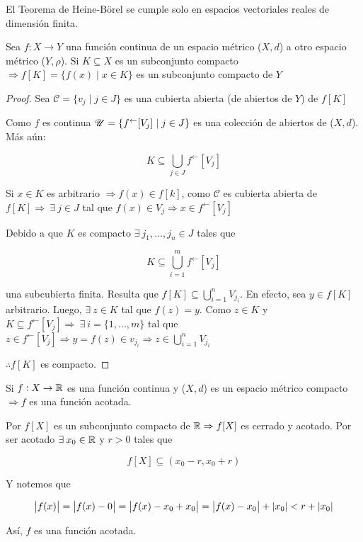 \begin{corollary}
    El Teorema de Heine-Börel se cumple solo en espacios vectoriales reales de dimensión finita.
\end{corollary}


\begin{theorem} \label{theom335}
    Sea $f : X \to Y$ una función continua de un espacio métrico ($X,d$) a otro espacio métrico ($Y,\rho$). Si $K \subseteq X$ es un subconjunto compacto $\Rightarrow f [K] = \{ f(x) \mid x \in K \}$ es un subconjunto compacto de $Y$
\end{theorem}

\begin{proof}
    Sea $\mathscr{C} = \{ v_j \mid j \in J \}$ es una cubierta abierta (de abiertos de $Y$) de $f[K]$

    Como $f$ es continua $\mathscr{U} = \{ f^\leftarrow[V_j] \mid j \in J \}$ es una colección de abiertos de ($X,d$). Más aún:

    $$K \subseteq \bigcup_{j\in  J} f^\leftarrow[V_j] $$

    Si $x \in K$ es arbitrario $\Rightarrow f(x) \in f[k]$, como $\mathscr{C}$ es cubierta abierta de $f[K] \Rightarrow \: \exists \: j \in J$ tal que $f(x) \in V_j \Rightarrow x \in f^\leftarrow[V_j] $

    Debido a que $K$ es compacto $\exists \: j_1, ..., j_n \in J$ tales que

    $$K \subseteq \bigcup_{i=1}^{m} f^\leftarrow[V_j] $$

    una subcubierta finita. Resulta que $f[K] \subseteq \bigcup_{i=1}^{n}V_{j_i}$. En efecto, sea $y \in f[K]$ arbitrario. Luego, $\exists \: z \in K$ tal que $f(z) = y$. Como $z \in K$ y $K \subseteq f^\leftarrow[V_j] \Rightarrow \: \exists \: i = \{1, ..., m \}$ tal que $z \in f^\leftarrow[V_j] 
 \Rightarrow y = f(z) \in v_{j_i}  \Rightarrow z \in \bigcup_{i=1}^{n}V_{j_i}$

 $\therefore f[K]$ es compacto.
\end{proof}

\begin{corollary}
    Si $f : X \to \mathbb{R}$ es una función continua y ($X,d$) es un espacio métrico compacto $\Rightarrow f$ es una función acotada. 
\end{corollary}

\begin{orangeproof}
    Por  $f[X]$ es un subconjunto compacto de $\mathbb{R} \Rightarrow f[X]$ es cerrado y acotado. Por ser acotado $\exists \: x_0 \in \mathbb{R}$ y $r > 0$ tales que

    $$f[X] \subseteq (x_0-r, x_0 + r)$$

    Y notemos que

    $$\abs{f(x)} = \abs{f(x)-0} = \abs{f(x)-x_0+x_0} = \abs{f(x)-x_0} + \abs{x_0} < r + \abs{x_0} $$

    Así, $f$ es una función acotada.
\end{orangeproof}

